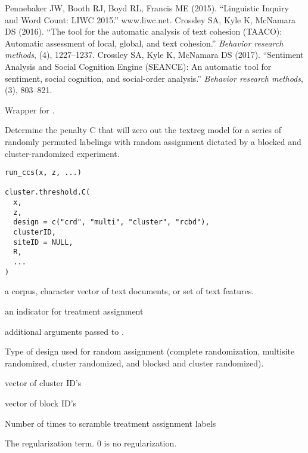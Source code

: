 \documentclass[a4paper]{book}
\begin{document}
%
\begin{References}\relax
 Pennebaker JW, Booth RJ, Boyd RL, Francis ME (2015).
``Linguistic Inquiry and Word Count: LIWC 2015.''
www.liwc.net.
Crossley SA, Kyle K, McNamara DS (2016).
``The tool for the automatic analysis of text cohesion (TAACO): Automatic assessment of local, global, and text cohesion.''
\emph{Behavior research methods}, (4), 1227--1237.
Crossley SA, Kyle K, McNamara DS (2017).
``Sentiment Analysis and Social Cognition Engine (SEANCE): An automatic tool for sentiment, social cognition, and social-order analysis.''
\emph{Behavior research methods}, (3), 803--821.
\end{References}
%
\begin{Description}\relax
Wrapper for .

Determine the penalty C that will zero out the textreg model for a series of
randomly permuted labelings with random assignment dictated by a blocked and
cluster-randomized experiment.
\end{Description}
%
\begin{Usage}
\begin{verbatim}
run_ccs(x, z, ...)

cluster.threshold.C(
  x,
  z,
  design = c("crd", "multi", "cluster", "rcbd"),
  clusterID,
  siteID = NULL,
  R,
  ...
)
\end{verbatim}
\end{Usage}
%
\begin{Arguments}
\begin{ldescription}
\item[\code{x}] a corpus, character vector of text documents, or set of text features.

\item[\code{z}] an indicator for treatment assignment

\item[\code{...}] additional arguments passed to .

\item[\code{design}] Type of design used for random assignment (complete
randomization, multisite randomized, cluster randomized, and blocked and cluster randomized).

\item[\code{clusterID}] vector of cluster ID's

\item[\code{siteID}] vector of block ID's

\item[\code{R}] Number of times to scramble treatment assignment labels

\item[\code{C}] The regularization term. 0 is no regularization.
\end{ldescription}
\end{Arguments}
\end{document}
